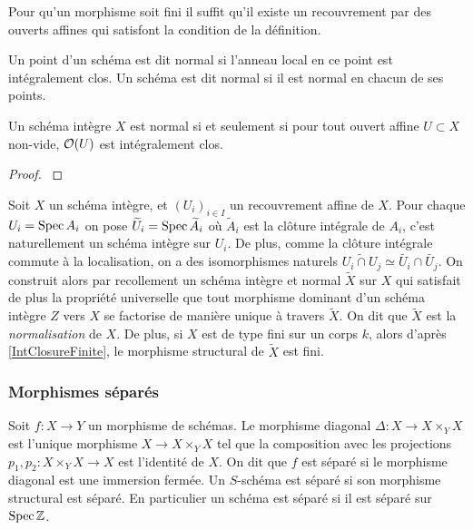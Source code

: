 \begin{rem}
Pour qu'un morphisme soit fini il suffit qu'il existe un recouvrement par des ouverts affines qui satisfont la condition de la définition.
\end{rem}


\begin{defn}
Un point d'un schéma est dit normal si l'anneau local en ce point est intégralement clos.
Un schéma est dit normal si il est normal en chacun de ses points.
\end{defn}

\begin{prop}
Un schéma intègre $X$ est normal si et seulement si pour tout ouvert affine $U\subset X$ non-vide, $\mathcal{O}(U)$ est intégralement clos.
\end{prop}
\begin{proof}
\cite[4.1.5]{QingLiu} 
\end{proof}


Soit $X$ un schéma intègre, et $(U_i)_{i\in I}$ un recouvrement affine de $X$. Pour chaque $U_i=\operatorname{Spec} A_i$ on pose $\widetilde{U}_i=\operatorname{Spec} \widetilde{A}_i$ où $\widetilde{A}_i$ est la clôture intégrale de $A_i$, c'est naturellement un schéma intègre sur $U_i$. De plus, comme la clôture intégrale  commute à la localisation, on a des isomorphismes naturels $\widetilde{U_i\cap U_j}\simeq \widetilde{U_i}\cap \widetilde{U_j}$. On construit alors par recollement un schéma intègre et normal $\widetilde{X}$ sur $X$ qui satisfait de plus la propriété universelle que tout morphisme dominant d'un schéma intègre $Z$ vers $X$ se factorise de manière unique à travers $\widetilde{X}$. On dit que $\widetilde{X}$ est la \textit{normalisation} de $X$. De plus, si $X$ est de type fini sur un corps $k$, alors d'après \ref{IntClosureFinite}, le morphisme structural de $\widetilde{X}$ est fini.

\subsubsection{Morphismes séparés}

\begin{defn}
Soit $f:X\rightarrow Y$ un morphisme de schémas. Le morphisme diagonal $\Delta:X\rightarrow X\times_Y X$ est l'unique morphisme $X\rightarrow X\times_Y X$ tel que la composition avec les projections $p_1,p_2:X\times_Y X\rightarrow X$ est l'identité de $X$. On dit que $f$ est séparé si le morphisme diagonal est une immersion fermée.
Un $S$-schéma est séparé si son morphisme structural est séparé. En particulier un schéma est séparé si il est séparé sur $\operatorname{Spec}\mathbb{Z}$.
\end{defn}

